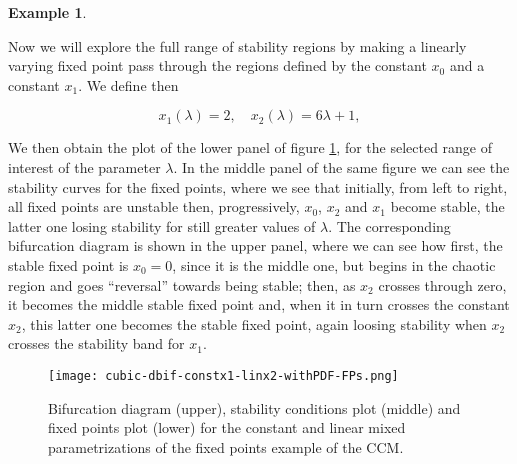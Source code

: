 \documentclass[10pt,twoside,titlepage]{book}
\numberwithin{equation}{chapter}
\numberwithin{figure}{chapter}
\numberwithin{table}{chapter}
\theoremstyle{plain}%
\theoremstyle{definition}
\newtheorem{example}{Example}[chapter]
\theoremstyle{remark}
\begin{document}
\begin{example}
	\label{ex:CCM-cstx1linx2}
	
	Now we will explore the full range of stability regions by making a linearly varying fixed point pass through the regions defined by the constant $x_0$ and a constant $x_1$. We define then
	
	\begin{equation}
		x_1(\lambda)=2,\quad x_2(\lambda)=6\lambda+1,
		\label{eq:CCM-cstx1linx2}
	\end{equation}
	
	We then obtain the plot of the lower panel of figure \ref{fig:CCM-cstx1linx2}, for the selected range of interest of the parameter $\lambda$. In the middle panel of the same figure we can see the stability curves for the fixed points, where we see that initially, from left to right, all fixed points are unstable then, progressively, $x_0$, $x_2$ and $x_1$ become stable, the latter one losing stability for still greater values of $\lambda$. The corresponding bifurcation diagram is shown in the upper panel, where we can see how first, the stable fixed point is $x_0=0$, since it is the middle one, but begins in the chaotic region and goes ``reversal'' towards being stable; then, as $x_2$ crosses through zero, it becomes the middle stable fixed point and, when it in turn crosses the constant $x_2$, this latter one becomes the stable fixed point, again loosing stability when $x_2$ crosses the stability band for $x_1$.
	
	\begin{figure}
		\centering
		\texttt{[image: cubic-dbif-constx1-linx2-withPDF-FPs.png]}
		\caption{Bifurcation diagram (upper), stability conditions plot (middle) and fixed points plot (lower) for the constant and linear mixed parametrizations of the fixed points example of the CCM.}
		\label{fig:CCM-cstx1linx2}
	\end{figure}
	
\end{example}

\FloatBarrier
\end{document}
